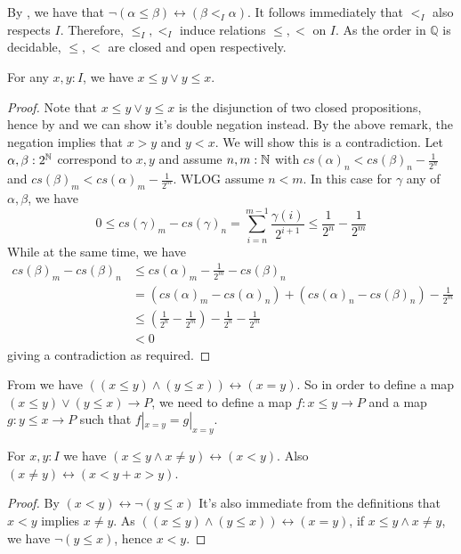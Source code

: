 \begin{remark}\label{NegationOfGeq}
  By , we have that $\neg (\alpha \leq \beta) \leftrightarrow (\beta <_I \alpha)$. 
  It follows immediately that $<_I$ also respects $I$. 
  Therefore, $\leq_I, <_I$ induce relations $\leq,<$ on $I$.
  As the order in $\mathbb Q$ is decidable, $\leq, <$ are closed and open respectively. 
\end{remark} 

\begin{lemma}\label{IntervalOrderLeqOrGeq}
  For any $x,y:I$, we have $x\leq y \vee y \leq x$. 
\end{lemma}
\begin{proof}
  Note that $x\leq y \vee y \leq x$ is the disjunction of two closed propositions, hence by 
   and  we can show it's double negation instead. 
  By the above remark, the negation implies that $x>y$ and $y<x$. We will show this is a contradiction. 
  Let $\alpha,\beta:2^{\mathbb{N}}$ correspond to $x,y$ and assume $n,m:\mathbb{N}$ with 
  $cs(\alpha)_n < cs(\beta)_n-\frac{1}{2^n}$ and 
  $cs(\beta)_m < cs(\alpha)_m-\frac{1}{2^m}$. 
  WLOG assume $n<m$. In this case for $\gamma$ any of $\alpha,\beta$, we have
  $$0\leq cs(\gamma)_m - cs(\gamma)_n = \sum_{i = n}^{m-1} \frac{\gamma(i)}{2^{i+1}}\leq \frac{1}{2^n}-\frac{1}{2^m}$$
  While at the same time, we have 
  \begin{align}
    cs(\beta)_m - cs(\beta)_n &\leq cs(\alpha)_m -\frac{1}{2^m} - cs (\beta)_n \\
                              & = (cs(\alpha)_m-cs(\alpha)_n)  +      (cs(\alpha)_n -cs(\beta)_n) - \frac{1}{2^m}\\
                              & \leq (\frac{1}{2^n} - \frac{1}{2^m}) -\frac{1}{2^n}               - \frac{1}{2^m}\\
                              &<0
  \end{align}
  giving a contradiction as required. 
\end{proof}

\begin{remark}\label{rmkMapOutOfLeqGeq}
  From  we have $((x\leq y) \wedge (y \leq x )) \leftrightarrow (x = y)$. 
  So in order to define a map $(x \leq y) \vee (y \leq x) \to P$, we need to define a map 
  $f:x\leq y \to P$ and a map $g:y \leq x \to P$ such that $f|_{x = y} = g|_{x=y}$. 
\end{remark}
\begin{corollary}
    For $x,y:I$ we have $(x\leq y \wedge x \neq y) \leftrightarrow (x < y)$. 
    Also $(x\neq y) \leftrightarrow (x < y + x > y)$. 
\end{corollary} 
\begin{proof}
    By $(x<y)\leftrightarrow \neg (y\leq x)$
    It's also immediate from the definitions that $x<y$ implies $x\neq y$. 
    As $((x\leq y) \wedge (y \leq x )) \leftrightarrow (x = y)$, 
    if $x\leq y \wedge x \neq y$, we have $\neg (y \leq x)$, hence $x<y$. 
\end{proof}

